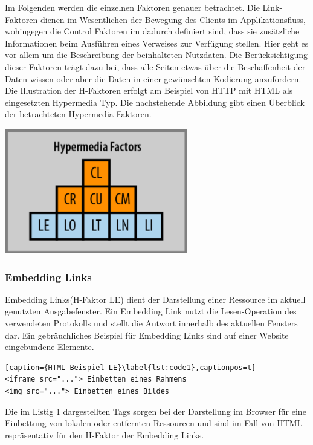 Im Folgenden werden die einzelnen Faktoren genauer betrachtet. Die Link-Faktoren dienen im Wesentlichen der Bewegung des Clients im Applikationsfluss, wohingegen die Control Faktoren im dadurch definiert sind, dass sie zusätzliche Informationen beim Ausführen eines Verweises zur Verfügung stellen. Hier geht es vor allem um die Beschreibung der beinhalteten Nutzdaten. Die Berücksichtigung dieser Faktoren trägt dazu bei, dass alle Seiten etwas über die Beschaffenheit der Daten wissen oder aber die Daten in einer gewünschten Kodierung anzufordern. Die Illustration der H-Faktoren erfolgt am Beispiel von HTTP mit HTML als eingesetzten Hypermedia Typ. Die nachstehende Abbildung gibt einen Überblick der betrachteten Hypermedia Faktoren.\\
\begin{center}
		\includegraphics[width=8cm]{graphicx/hfaktoren.png}
		\label{hfaktoren}
	\end{center}



\subsubsection{Embedding Links}
Embedding Links(H-Faktor LE) dient der Darstellung einer Ressource im aktuell genutzten Ausgabefenster. Ein Embedding Link nutzt die Lesen-Operation des verwendeten Protokolls und stellt die Antwort innerhalb des aktuellen Fensters dar. Ein gebräuchliches Beispiel für Embedding Links sind auf einer Website eingebundene Elemente.\\
\begin{lstlisting}[caption={HTML Beispiel LE}\label{lst:code1},captionpos=t]
<iframe src="..."> Einbetten eines Rahmens
<img src="..."> Einbetten eines Bildes
\end{lstlisting}
Die im Listig 1 dargestellten Tags sorgen bei der Darstellung im Browser für eine Einbettung von lokalen oder entfernten Ressourcen und sind im Fall von HTML repräsentativ für den H-Faktor der Embedding Links.


